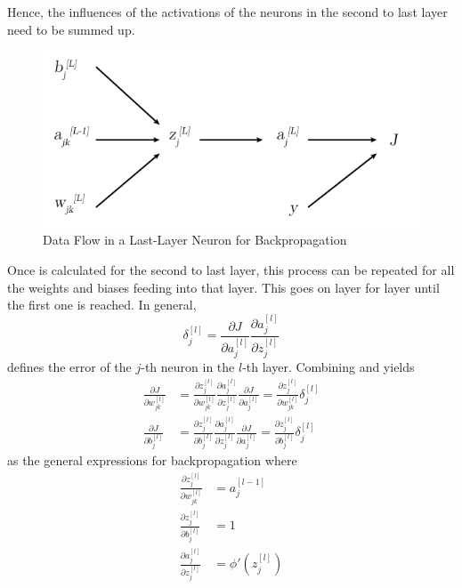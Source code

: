 Hence, the influences of the activations of the neurons in the second to last layer need to be summed up.
\begin{figure}
	\centering
	\includegraphics[]{images/backpropagation_influences.pdf}
	\caption[Data Flow in a Last-Layer Neuron for Backpropagation]{Data Flow in a Last-Layer Neuron for Backpropagation}
	\label{fig:backpropagation-influences}
\end{figure}
Once  is calculated for the second to last layer, this process can be repeated for all the weights and biases feeding into that layer.
This goes on layer for layer until the first one is reached.
In general,
\begin{equation}
	\label{eq:backpropagation-neuron-error}
	\delta^{[l]}_j = \frac{\partial J}{\partial a^{[l]}_j} \frac{\partial a^{[l]}_{j}}{\partial z^{[l]}_{j}}
\end{equation}
defines the error of the $j$-th neuron in the $l$-th layer.
Combining  and  yields
\begin{subequations}
	\label{eq:backpropagation-general}
	\begin{align}
		\frac{\partial J}{\partial w^{[l]}_{jk}} &= \frac{\partial z^{[l]}_j}{\partial w^{[l]}_{jk}} \frac{\partial a^{[l]}_{j}} {\partial z^{[l]}_{j}} \frac{\partial J}{\partial a^{[l]}_j} = \frac{\partial z^{[l]}_j}{\partial w^{[l]}_{jk}} \delta^{[l]}_j \\
		\frac{\partial J}{\partial b^{[l]}_{j}} &= \frac{\partial z^{[l]}_j}{\partial b^{[l]}_{j}} \frac{\partial a^{[l]}_{j}} {\partial z^{[l]}_{j}} \frac{\partial J}{\partial a^{[l]}_j} = \frac{\partial z^{[l]}_j}{\partial b^{[l]}_{j}} \delta^{[l]}_j
	\end{align}
\end{subequations}
as the general expressions for backpropagation where
\begin{subequations}
	\begin{align}
		\frac{\partial z^{[l]}_j}{\partial w^{[l]}_{jk}} &= a^{[l-1]}_j \\
		\frac{\partial z^{[l]}_j}{\partial b^{[l]}_j} &= 1 \\
		\frac{\partial a^{[l]}_{j}}{\partial z^{[l]}_{j}} &= \phi'(z^{[l]}_j)
	\end{align}
\end{subequations}
